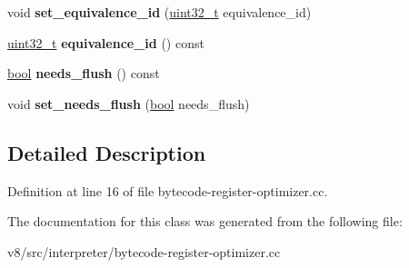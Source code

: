 \begin{DoxyCompactItemize}
\mbox{\label{classv8_1_1internal_1_1interpreter_1_1BytecodeRegisterOptimizer_1_1RegisterInfo_a4524e4c37438eca0d04d356dcd1621d9}} 
void {\bfseries set\+\_\+equivalence\+\_\+id} (\mbox{\hyperlink{classuint32__t}{uint32\+\_\+t}} equivalence\+\_\+id)
\item 
\mbox{\label{classv8_1_1internal_1_1interpreter_1_1BytecodeRegisterOptimizer_1_1RegisterInfo_a6fac789355a76a14c199ba1c2a5dfb86}} 
\mbox{\hyperlink{classuint32__t}{uint32\+\_\+t}} {\bfseries equivalence\+\_\+id} () const
\item 
\mbox{\label{classv8_1_1internal_1_1interpreter_1_1BytecodeRegisterOptimizer_1_1RegisterInfo_aeffa9b045b9481a90dd61d50ac6fbe8a}} 
\mbox{\hyperlink{classbool}{bool}} {\bfseries needs\+\_\+flush} () const
\item 
\mbox{\label{classv8_1_1internal_1_1interpreter_1_1BytecodeRegisterOptimizer_1_1RegisterInfo_a24a3eb0f432bc17a164d1485a8e0a05c}} 
void {\bfseries set\+\_\+needs\+\_\+flush} (\mbox{\hyperlink{classbool}{bool}} needs\+\_\+flush)
\end{DoxyCompactItemize}


\subsection{Detailed Description}


Definition at line 16 of file bytecode-\/register-\/optimizer.\+cc.



The documentation for this class was generated from the following file\+:\begin{DoxyCompactItemize}
\item 
v8/src/interpreter/bytecode-\/register-\/optimizer.\+cc\end{DoxyCompactItemize}
